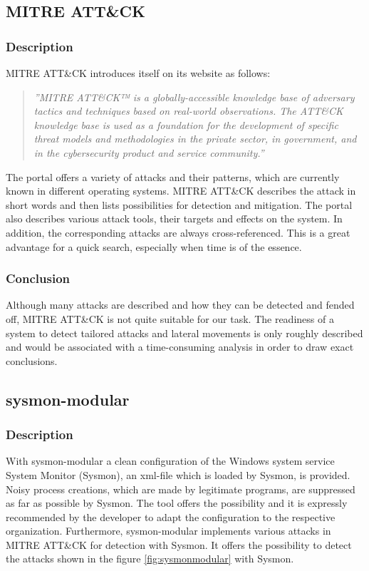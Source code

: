 \subsection{MITRE ATT\&CK}
\subsubsection{Description}
MITRE ATT\&CK introduces itself on its website as follows:
\begin{quotation}
    \textit{''MITRE ATT\&CK™ is a globally-accessible knowledge base of adversary tactics and techniques based on real-world observations. The ATT\&CK knowledge base is used as a foundation for the development of specific threat models and methodologies in the private sector, in government, and in the cybersecurity product and service community.'' \cite{MITRE}} 
\end{quotation}
The portal offers a variety of attacks and their patterns, which are currently known in different operating systems. MITRE ATT\&CK describes the attack in short words and then lists possibilities for detection and mitigation. The portal also describes various attack tools, their targets and effects on the system. In addition, the corresponding attacks are always cross-referenced. This is a great advantage for a quick search, especially when time is of the essence.

\subsubsection{Conclusion}
Although many attacks are described and how they can be detected and fended off, MITRE ATT\&CK is not quite suitable for our task. The readiness of a system to detect tailored attacks and lateral movements is only roughly described and would be associated with a time-consuming analysis in order to draw exact conclusions.

\clearpage

\subsection{sysmon-modular}
\subsubsection{Description}
With sysmon-modular \cite{sysmon-modular} a clean configuration of the Windows system service System Monitor (Sysmon), an xml-file which is loaded by Sysmon, is provided. Noisy process creations, which are made by legitimate programs, are suppressed as far as possible by Sysmon. The tool offers the possibility and it is expressly recommended by the developer to adapt the configuration to the respective organization. Furthermore, sysmon-modular implements various attacks in MITRE ATT\&CK for detection with Sysmon. It offers the possibility to detect the attacks shown in the figure \ref{fig:sysmonmodular} with Sysmon.

